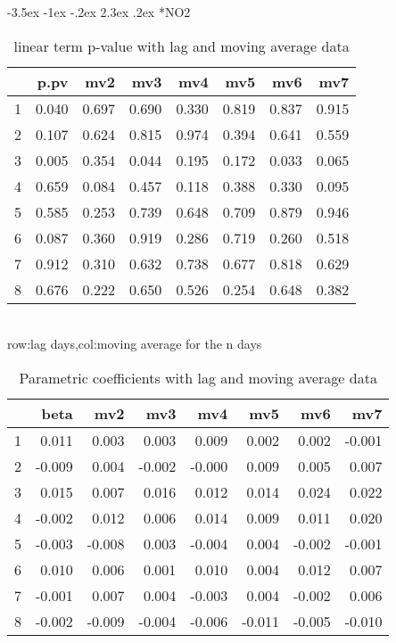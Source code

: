 \documentclass[a4paper, 12pt]{article}
\makeatletter
\def\large{\fontsize{14}{20}\selectfont}
\renewcommand\subsection{\@startsection {subsection}{1}{\z@}%
                                   {-3.5ex \@plus -1ex \@minus -.2ex}%
                                   {2.3ex \@plus.2ex}%
                                   {\centering\normalfont\large\bfseries}}
\makeatother
\begin{document}
\subsection*{NO2}
\begin{table}[h]
\centering
\caption{linear term p-value with lag and moving average data}
\begin{tabular}{rrrrrrrr}
  \hline
 & p.pv & mv2 & mv3 & mv4 & mv5 & mv6 & mv7 \\
  \hline
1 & 0.040 & 0.697 & 0.690 & 0.330 & 0.819 & 0.837 & 0.915 \\
  2 & 0.107 & 0.624 & 0.815 & 0.974 & 0.394 & 0.641 & 0.559 \\
  3 & 0.005 & 0.354 & 0.044 & 0.195 & 0.172 & 0.033 & 0.065 \\
  4 & 0.659 & 0.084 & 0.457 & 0.118 & 0.388 & 0.330 & 0.095 \\
  5 & 0.585 & 0.253 & 0.739 & 0.648 & 0.709 & 0.879 & 0.946 \\
  6 & 0.087 & 0.360 & 0.919 & 0.286 & 0.719 & 0.260 & 0.518 \\
  7 & 0.912 & 0.310 & 0.632 & 0.738 & 0.677 & 0.818 & 0.629 \\
  8 & 0.676 & 0.222 & 0.650 & 0.526 & 0.254 & 0.648 & 0.382 \\
   \hline
\end{tabular}
\\row:lag days,col:moving average for the n days
\end{table}

\begin{table}[h]
\centering
\caption{Parametric coefficients with lag and moving average data}
\begin{tabular}{rrrrrrrr}
  \hline
 & beta & mv2 & mv3 & mv4 & mv5 & mv6 & mv7 \\
  \hline
1 & 0.011 & 0.003 & 0.003 & 0.009 & 0.002 & 0.002 & -0.001 \\
  2 & -0.009 & 0.004 & -0.002 & -0.000 & 0.009 & 0.005 & 0.007 \\
  3 & 0.015 & 0.007 & 0.016 & 0.012 & 0.014 & 0.024 & 0.022 \\
  4 & -0.002 & 0.012 & 0.006 & 0.014 & 0.009 & 0.011 & 0.020 \\
  5 & -0.003 & -0.008 & 0.003 & -0.004 & 0.004 & -0.002 & -0.001 \\
  6 & 0.010 & 0.006 & 0.001 & 0.010 & 0.004 & 0.012 & 0.007 \\
  7 & -0.001 & 0.007 & 0.004 & -0.003 & 0.004 & -0.002 & 0.006 \\
  8 & -0.002 & -0.009 & -0.004 & -0.006 & -0.011 & -0.005 & -0.010 \\
   \hline
\end{tabular}
\end{table}
\clearpage
\end{document}
